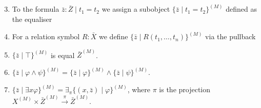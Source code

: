 \documentclass[14pt]{beamer}
\theoremstyle{plain}
\begin{document}
  \begin{frame}[fragile]
    \begin{enumerate}
      \setcounter{enumi}{2}
      \item To the formula $\bar{z} : \bar{Z} \mid t_1 = t_2$ we assign a subobject
        $\{\bar{z} \mid t_1 = t_2 \}^{(M)}$ defined as the equaliser
        \begin{center}
        \end{center}
      \item For a relation symbol $R : \bar{X}$ we define $\{ \bar{z} \mid R(t_1, \ldots, t_n)\}^{(M)}$
        via the pullback
        \begin{center}
        \end{center}
    \end{enumerate}
  \end{frame}

  \begin{frame}
    \begin{enumerate}
      \setcounter{enumi}{4}
      \item $\{ \bar{z} \mid \top \}^{(M)}$ is equal $\bar{Z}^{(M)}$.
      \vspace{1em}
      \item $\{\bar{z} \mid \varphi \wedge \psi\}^{(M)} = \{\bar{z} \mid
        \varphi\}^{(M)} \wedge \{\bar{z} \mid \psi\}^{(M)}$.
      \vspace{1em}
      \item $\{\bar{z} \mid \exists x \varphi\}^{(M)} =
        \exists_{\pi}\{(x, \bar{z}) \mid \varphi\}^{(M)}$, where
        $\pi$ is the projection
        $X^{(M)} \times \bar{Z}^{(M)} \xrightarrow{\pi} \bar{Z}^{(M)}$.
    \end{enumerate}
  \end{frame}
\end{document}
